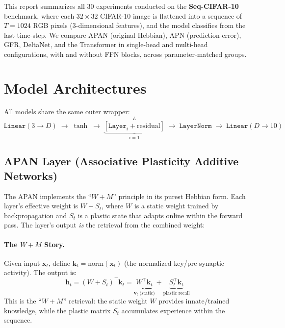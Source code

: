 \documentclass[11pt,a4paper]{article}
\begin{document}
This report summarizes all 30 experiments conducted on the \textbf{Seq-CIFAR-10} benchmark, where each $32 \times 32$ CIFAR-10 image is flattened into a sequence of $T = 1024$ RGB pixels ($3$-dimensional features), and the model classifies from the last time-step.
We compare APAN (original Hebbian), APN (prediction-error), GFR, DeltaNet, and the Transformer in single-head and multi-head configurations, with and without FFN blocks, across parameter-matched groups.

\section{Model Architectures}

All models share the same outer wrapper:
\[
\texttt{Linear}(3 \to D) \;\to\; \tanh \;\to\; \underbrace{[\texttt{Layer}_i + \text{residual}]}_{i=1}^{L} \;\to\; \texttt{LayerNorm} \;\to\; \texttt{Linear}(D \to 10)
\]

\subsection{APAN Layer (Associative Plasticity Additive Networks)}
\label{sec:apan}

The APAN implements the ``$W + M$'' principle in its purest Hebbian form.
Each layer's effective weight is $W + S_t$, where $W$ is a static weight trained by backpropagation and $S_t$ is a plastic state that adapts online within the forward pass.
The layer's output \emph{is} the retrieval from the combined weight:

\paragraph{The $W + M$ Story.}
Given input $\mathbf{x}_t$, define $\mathbf{k}_t = \text{norm}(\mathbf{x}_t)$ (the normalized key/pre-synaptic activity).
The output is:
\begin{equation}
\mathbf{h}_t = (W + S_t)^\top \mathbf{k}_t = \underbrace{W^\top \mathbf{k}_t}_{\mathbf{v}_t\;\text{(static)}} + \underbrace{S_t^\top \mathbf{k}_t}_{\text{plastic recall}}
\end{equation}
This is the ``$W + M$'' retrieval: the static weight $W$ provides innate/trained knowledge, while the plastic matrix $S_t$ accumulates experience within the sequence.
\end{document}
